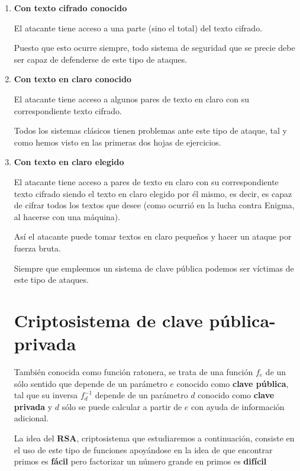 \begin{enumerate}
\item \textbf{Con texto cifrado conocido}

El atacante tiene acceso a una parte (sino el total) del texto cifrado.

Puesto que esto ocurre siempre, todo sistema de seguridad que se precie debe ser capaz de defenderse de este tipo de ataques.

\item \textbf{Con texto en claro conocido}

El atacante tiene acceso a algunos pares de texto en claro con su correspondiente texto cifrado.

Todos los sistemas clásicos tienen problemas ante este tipo de ataque, tal y como hemos visto en las primeras dos hojas de ejercicios.

\item \textbf{Con texto en claro elegido}

El atacante tiene acceso a pares de texto en claro con su correspondiente texto cifrado siendo el texto en claro elegido por él mismo, es decir, es capaz de cifrar todos los textos que desee (como ocurrió en la lucha contra Enigma, al hacerse con una máquina).

Así el atacante puede tomar textos en claro pequeños y hacer un ataque por fuerza bruta.

Siempre que empleemos un sistema de clave pública podemos ser víctimas de este tipo de ataques. 

\section{Criptosistema de clave pública-privada}

\begin{defn}
También conocida como función ratonera, se trata de una función $f_e$ de un sólo sentido que depende de un parámetro $e$ conocido como \textbf{clave pública}, tal que su inversa $f^{-1}_d$ depende de un parámetro $d$ conocido como \textbf{clave privada} y $d$ sólo se puede calcular a partir de $e$ con ayuda de información adicional.
\end{defn}


La idea del \textbf{RSA}, criptosistema que estudiaremos a continuación, consiste en el uso de este tipo de funciones apoyándose en la idea de que encontrar primos es \textbf{fácil} pero factorizar un número grande en primos es \textbf{difícil}
\end{enumerate}


